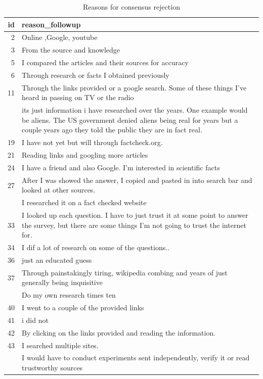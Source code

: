 \documentclass[
  doc,floatsintext]{apa6}
\begin{document}
\begin{longtable}[t]{>{}r>{\raggedright\arraybackslash}p{30em}}
\caption{\label{tab:exp4-independent-verification}Reasons for consensus rejection}\\
\toprule
id & reason\_followup\\
\midrule
2 & Online ,Google, youtube\\
3 & From the source and knowledge\\
5 & I compared the articles and their sources for accuracy\\
6 & Through research or facts I obtained previously\\
11 & Through the links provided or a google search. Some of these things I've heard in passing on TV or the radio\\
\addlinespace
17 & its just information i have researched over the years. One example would be aliens. The US government denied aliens being real for years but a couple years ago they told the public they are in fact real.\\
19 & I have not yet but will through factcheck.org.\\
21 & Reading links and googling more articles\\
24 & I have a friend and also Google.  I'm interested in scientific facts\\
27 & After I was showed the answer, I copied and pasted in into search bar and looked at other sources.\\
\addlinespace
31 & I researched it on a fact checked website\\
33 & I looked up each question. I have to just trust it at some point to answer the survey, but there are some things I'm not going to trust the internet for.\\
34 & I dif a lot of research on some of the questions..\\
36 & just an educated guess\\
37 & Through painstakingly tiring, wikipedia combing and years of just generally being inquisitive\\
\addlinespace
38 & Do my own research times ten\\
40 & I went to a couple of the provided links\\
41 & i did not\\
42 & By clicking on the links provided and reading the information.\\
43 & I searched multiple sites.\\
\addlinespace
44 & I would have to conduct experiments sent independently, verify it or read trustworthy sources\\

\end{longtable}
\end{document}
